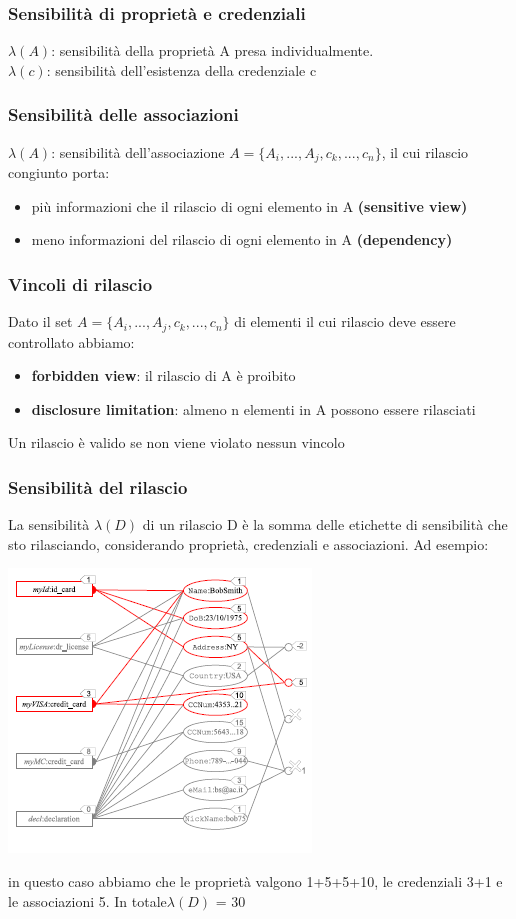 \subsubsection{Sensibilità di proprietà e credenziali}
\(\lambda(A)\): sensibilità della proprietà A presa individualmente.\\
\(\lambda(c)\): sensibilità dell'esistenza della credenziale c

\subsubsection{Sensibilità delle associazioni}
\(\lambda(A)\): sensibilità dell'associazione \(A = \{A_i,...,A_j,c_k,...,c_n\}\), il cui rilascio congiunto porta:
\begin{itemize}
    \item più informazioni che il rilascio di ogni elemento in A \textbf{(sensitive view)}
    \item meno informazioni del rilascio di ogni elemento in A \textbf{(dependency)}
\end{itemize}

\subsubsection{Vincoli di rilascio}
Dato il set \(A = \{A_i,...,A_j,c_k,...,c_n\}\) di elementi il cui rilascio deve essere controllato abbiamo:
\begin{itemize}
    \item \textbf{forbidden view}: il rilascio di A è proibito
    \item \textbf{disclosure limitation}: almeno n elementi in A possono essere rilasciati
\end{itemize}
Un rilascio è valido se non viene violato nessun vincolo

\subsubsection{Sensibilità del rilascio}
La sensibilità \(\lambda(D)\) di un rilascio D è la somma delle etichette di sensibilità che sto rilasciando, considerando proprietà, credenziali e associazioni. Ad esempio:
\begin{center}
    \includegraphics[scale=0.6]{img/discsens.png}
\end{center}
in questo caso abbiamo che le proprietà valgono 1+5+5+10, le credenziali 3+1 e le associazioni 5. In totale\(\lambda(D)\) = 30


